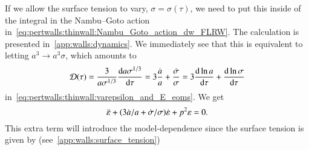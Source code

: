     If we allow the surface tension to vary, $\sigma=\sigma(\tau)$, %
    we need to put this inside of the integral in the Nambu--Goto action in~\cref{eq:pertwalls:thinwall:Nambu_Goto_action_dw_FLRW}. The calculation is presented in~\cref{app:walls:dynamics}. We immediately see that this is equivalent to letting $a^3\to a^3 \sigma$, which amounts to
    \begin{equation}
        \mathcal{D}(\tau) = \frac{3}{a\sigma^{1/3}} \dv{a\sigma^{1/3}}{\tau} =  3\frac{\dot{a}}{a} +  \frac{\dot{\sigma}}{\sigma} = 3\dv{\ln{a}}{\tau} + \dv{\ln{\sigma}}{\tau}
    \end{equation}
    in~\cref{eq:pertwalls:thinwall:varepsilon_and_E_eoms}. We get
    \begin{equation}
        \ddot{\varepsilon} + {\left( 3\dot{a}/a + \dot{\sigma}/\sigma \right)}\dot{\varepsilon} +p^2 \varepsilon = 0.
    \end{equation}
    This extra term will introduce the model-dependence since the surface tension is given by (see~\cref{app:walls:surface_tension})%
